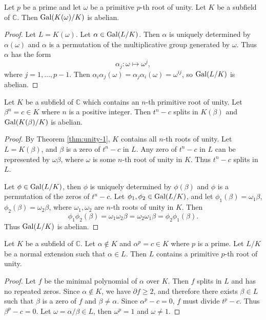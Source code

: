 \begin{theorem} \label{thm:radical-1}
	Let $p$ be a prime and let $\omega$ be a primitive $p$-th root of unity. Let $K$ be a subfield of $\mathbb C$. Then $\operatorname{Gal}(K(\omega) / K)$ is abelian.
\end{theorem}
\begin{proof}
	Let $L = K(\omega)$.  Let $\alpha \in \operatorname{Gal}(L / K)$. Then $\alpha$ is uniquely determined by $\alpha(\omega)$ and $\alpha$ is a permutation of the multiplicative group generated by $\omega$. Thus $\alpha$ has the form
	$$
	\alpha_j: \omega \mapsto \omega^j,
	$$
	where $j=1,\dots,p-1$. Then $\alpha_i \alpha_j (\omega) = \alpha_j \alpha_i (\omega) = \omega^{i j}$, so $ \operatorname{Gal}(L / K)$ is abelian.
	
\end{proof}

\begin{theorem} \label{thm:radical-2}
	Let $K$ be a subfield of $\mathbb{C}$ which contains an $n$-th primitive root of unity. Let $\beta^n = c \in K $ where $n$ is a positive integer. Then $t^n - c$ splits in $K(\beta)$ and $\operatorname{Gal}(K(\beta) / K)$ is abelian.
\end{theorem}

\begin{proof}
	By Theorem \ref{thm:unity-1}, $K$ contains all $n$-th roots of unity. Let $L = K(\beta)$, and $\beta$ is a zero of $t^n-c$ in $L$. Any zero of $t^n-c$ in $L$ can be represented by $\omega \beta$, where $\omega$ is some $n$-th root of unity in $K$. Thus $t^n - c$ splits in $L$.  
	
	Let $\phi \in \operatorname{Gal}(L / K)$, then $\phi$ is uniquely determined by $\phi(\beta)$ and $\phi$ is a permutation of the zeros of $t^n - c$. Let $\phi_1, \phi_2 \in \operatorname{Gal}(L / K)$, and let $\phi_1(\beta) = \omega_1\beta$, $\phi_2(\beta) = \omega_2\beta$, where $\omega_1, \omega_2$ are $n$-th roots of unity in $K$. Then
	$$
	\phi_1 \phi_2(\beta)=\omega_1 \omega_2 \beta=\omega_2 \omega_1  \beta=\phi_2 \phi_1(\beta).
	$$
	Thus $\operatorname{Gal}(L / K)$ is abelian.
\end{proof}

\begin{theorem} \label{thm:unity-3}
	Let $K$ be a subfield of $\mathbb C$. Let $\alpha \notin K$ and $\alpha^p = c \in K$ where $p$ is a prime. Let $L / K$ be a normal extension such that $\alpha \in L$. Then $L$ contains a primitive $p$-th root of unity.
\end{theorem}

\begin{proof}
	Let $f$ be the minimal polynomial of $\alpha$ over $K$. Then $f$ splits in $L$ and has no repeated zeros. Since $\alpha \notin K$, we have $\partial f \ge 2$, and therefore there exists $\beta \in L$ such that $\beta$ is a zero of $f$ and $\beta \neq \alpha$. Since $\alpha ^ p - c = 0$, $f$ must divide $t ^ p - c$. Thus $\beta^p - c = 0$. Let $\omega=\alpha / \beta \in L $, then $\omega^p=1$ and $\omega \neq 1$.
\end{proof}





